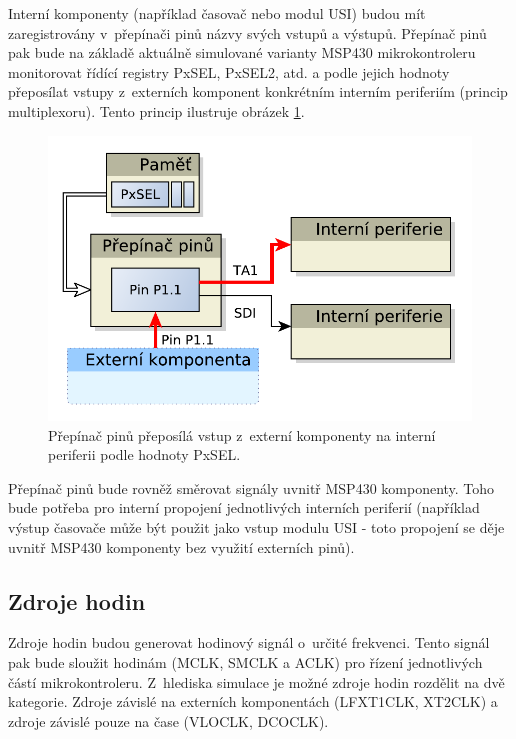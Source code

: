 Interní komponenty (například časovač nebo modul USI) budou mít zaregistrovány v~přepínači pinů názvy svých vstupů a výstupů.
Přepínač pinů pak bude na základě aktuálně simulované varianty MSP430 mikrokontroleru monitorovat řídící registry PxSEL, PxSEL2, atd. a podle jejich hodnoty přeposílat vstupy z~externích komponent konkrétním interním periferiím (princip multiplexoru). Tento princip ilustruje obrázek \ref{fig:msp430_pinmult}.

\begin{figure}[h]
\centering
\includegraphics[trim=0cm 0cm 0cm 0cm, scale=0.7]{fig/msp430_pinmult}
\caption{Přepínač pinů přeposílá vstup z~externí komponenty na interní periferii podle hodnoty PxSEL.}
\label{fig:msp430_pinmult}
\end{figure}

Přepínač pinů bude rovněž směrovat signály uvnitř MSP430 komponenty. Toho bude potřeba pro interní propojení jednotlivých interních periferií (například výstup časovače může být použit jako vstup modulu USI - toto propojení se děje uvnitř MSP430 komponenty bez využití externích pinů).

\subsection{Zdroje hodin}

Zdroje hodin budou generovat hodinový signál o~určité frekvenci. Tento signál pak bude sloužit hodinám (MCLK, SMCLK a ACLK) pro řízení jednotlivých částí mikrokontroleru. Z~hlediska simulace je možné zdroje hodin rozdělit na dvě kategorie. Zdroje závislé na externích komponentách (LFXT1CLK, XT2CLK) a zdroje závislé pouze na čase (VLOCLK, DCOCLK).

